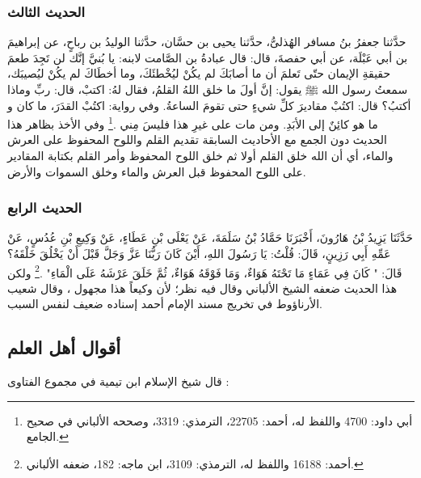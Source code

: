 \subsubsection{الحديث الثالث}
\label{sec:app_first_creation_hadith_3}

حدَّثنا جعفرُ بنُ مسافر الهُذلىُّ، حدَّثنا يحيى بن حسَّان، حدَّثنا الوليدُ بن رباحٍ، عن إبراهيمَ بن أبي عَبْلَة، عن أبي حفصةَ، قال: قال عبادةُ بن الصَّامت لابنه: يا بُنيَّ إنَّك لن تَجِدَ طعمَ حقيقةِ الإيمان حتّى تَعلمَ أن ما أصابَكَ لم يكُنْ ليُخْطئَكَ، وما أخطَاكَ لم يكُنْ ليُصيبَك، سمعتُ رسول الله ﷺ يقول: إنَّ أولَ ما خلق اللهُ القلمُ، فقال لهُ: اكتبْ، قال: ربِّ وماذا أكتبُ؟ قال: اكتُبْ مقاديرَ كلِّ شيءٍ حتى تقومَ الساعةُ. وفي رواية: اكتُبْ القدَرَ، ما كان و ما هو كائِنٌ إلى الأبَدِ. ومن مات على غيرِ هذا فليسَ مِني \href{https://shamela.ws/book/117359/3975#p2}{\faExternalLink} \cite{SunanAbiDawood}.\footnote{أبي داود: 4700 واللفظ له، أحمد: 22705، الترمذي: 3319، وصححه الألباني في صحيح الجامع.} وفي الأخذ بظاهر هذا الحديث دون الجمع مع الأحاديث السابقة تقديم القلم واللوح المحفوظ على العرش والماء، أي أن الله خلق القلم أولا ثم خلق اللوح المحفوظ وأمر القلم بكتابة المقادير على اللوح المحفوظ قبل العرش والماء وخلق السموات والأرض.

\subsubsection{الحديث الرابع}
\label{sec:app_first_creation_hadith_4}

حَدَّثَنَا يَزِيدُ بْنُ هَارُونَ، أَخْبَرَنَا حَمَّادُ بْنُ سَلَمَةَ، عَنْ يَعْلَى بْنِ عَطَاءٍ، عَنْ وَكِيعِ بْنِ عُدُسٍ، عَنْ عَمِّهِ أَبِي رَزِينٍ، قَالَ: قُلْتُ: يَا رَسُولَ اللهِ، أَيْنَ كَانَ رَبُّنَا عَزَّ وَجَلَّ قَبْلَ أَنْ يَخْلُقَ خَلْقَهُ؟ قَالَ: " كَانَ فِي عَمَاءٍ مَا تَحْتَهُ هَوَاءٌ، وَمَا فَوْقَهُ هَوَاءٌ، ثُمَّ خَلَقَ عَرْشَهُ عَلَى الْمَاءِ" \href{https://shamela.ws/book/25794/12650#p1}{\faExternalLink} \cite{ahmid}.\footnote{أحمد: 16188 واللفظ له، الترمذي: 3109، ابن ماجه: 182، ضعفه الألباني.}  ولكن هذا الحديث ضعفه الشيخ الألباني وقال فيه نظر؛ لأن وكيعاً هذا مجهول \href{https://shamela.ws/book/9442/5278#p10}{\faExternalLink} \cite{albani_Sahiha}، وقال شعيب الأرناؤوط في تخريج مسند الإمام أحمد إسناده ضعيف لنفس السبب.
\subsection{أقوال أهل العلم}

قال شيخ الإسلام ابن تيمية في مجموع الفتاوى \href{https://shamela.ws/book/7289/9349#p1}{\faExternalLink}:

